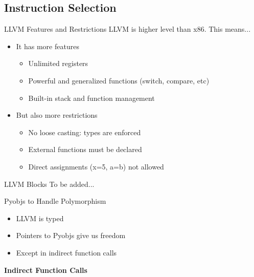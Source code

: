 \documentclass{beamer}
\begin{document}
\subsection{Instruction Selection}

\begin{frame}{LLVM Features and Restrictions}
  LLVM is higher level than x86. This means...
  \pause
  \begin{itemize}
  \item<1->It has more features
    \begin{itemize}
    \item<2->Unlimited registers
    \item<3->Powerful and generalized functions (switch, compare, etc)
    \item<4->Built-in stack and function management
    \end{itemize}
  \item<5->But also more restrictions
    \begin{itemize}
      \item<6-> No loose casting: types are enforced
      \item<7-> External functions must be declared
      \item<8-> Direct assignments (x=5, a=b) not allowed
    \end{itemize}
  \end{itemize}
\end{frame}


\begin{frame}{LLVM Blocks}
  To be added...
\end{frame}

\begin{frame}{Pyobjs to Handle Polymorphism}
\begin{itemize}
  \item<1->LLVM is typed
  \item<2->Pointers to Pyobjs give us freedom
  \item<3->Except in indirect function calls
\end{itemize}
\end{frame}

\begin{frame}{\bf Indirect Function Calls}
  
\end{frame}
\end{document}

